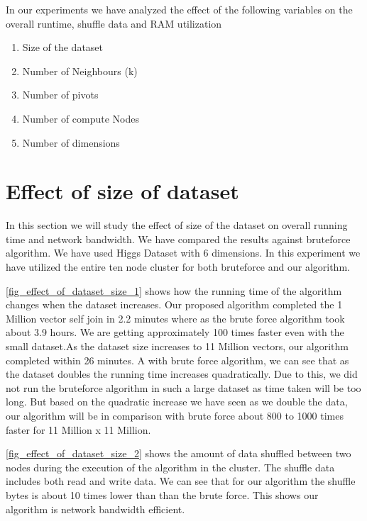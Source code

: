 \begin{minipage}{\linewidth}
In our experiments we have analyzed the effect of the following variables on the
overall runtime, shuffle data and RAM utilization
\begin{enumerate}
\item Size of the dataset
\item Number of Neighbours (k)
\item Number of pivots
\item Number of compute Nodes
\item Number of dimensions
\end{enumerate}
\end{minipage}

\section{Effect of size of dataset}

In this section we will study the effect of size of the dataset on overall running
time and network bandwidth. We have compared the results against bruteforce algorithm.
We have used Higgs Dataset with 6 dimensions. In this experiment we
have utilized the entire ten node cluster for both bruteforce and our
algorithm.

\cref{fig_effect_of_dataset_size_1} shows how
the running time of the algorithm changes when the dataset increases.
Our proposed algorithm completed the 1 Million vector self join
in 2.2 minutes where as the brute force algorithm took about 3.9
hours. We are getting approximately 100 times faster even with the small
dataset.As the dataset size increases to 11 Million vectors, our
algorithm completed within 26 minutes. A with brute force algorithm, we can see that as the dataset doubles the running time
increases quadratically.  Due to this, we did not run the bruteforce
algorithm in such a large dataset as time taken will be too long. But
based on the quadratic increase we have seen as we double the data, our algorithm will be in comparison with
brute force about 800 to 1000 times faster for 11 Million x 11 Million.

\cref{fig_effect_of_dataset_size_2} shows the amount of data
shuffled between two nodes during the execution of the algorithm in
the cluster. The shuffle data includes both read and
write data. We can see that for our algorithm the shuffle bytes is
about 10 times lower than than the brute force. This shows our
algorithm is network bandwidth efficient.


